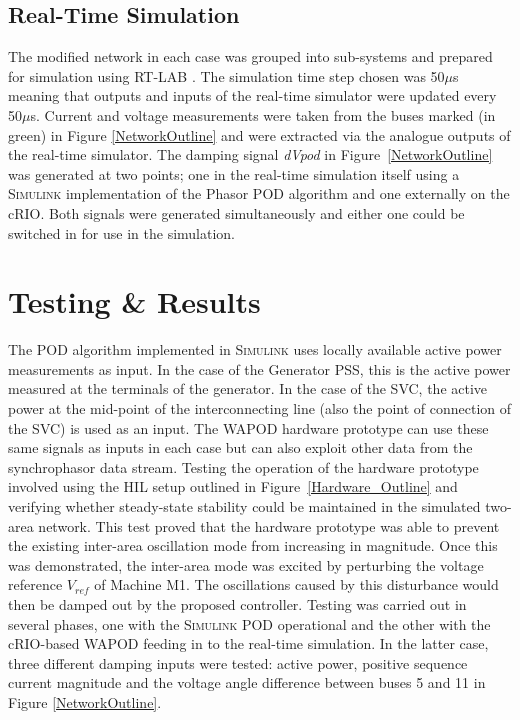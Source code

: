 \documentclass{ieeeaccess}
\begin{document}
\subsection{Real-Time Simulation}
The modified network in each case was grouped into sub-systems and prepared for simulation using RT-LAB \cite{eMEGASIM}. The simulation time step chosen was 50$\mu$s meaning that outputs and inputs of the real-time simulator were updated every 50$\mu$s. Current and voltage measurements were taken from the buses marked (in green) in Figure \ref{NetworkOutline} and were extracted via the analogue outputs of the real-time simulator. The damping signal \emph{dVpod} in Figure~\ref{NetworkOutline} was generated at two points; one in the real-time simulation itself using a \textsc{Simulink} implementation of the Phasor POD algorithm and one externally on the cRIO. Both signals were generated simultaneously and either one could be switched in for use in the simulation.

\section{Testing \& Results}\label{Results}
The POD algorithm implemented in \textsc{Simulink} uses locally available active power measurements as input. In the case of the Generator PSS, this is the active power measured at the terminals of the generator. In the case of the SVC, the active power at the mid-point of the interconnecting line (also the point of connection of the SVC) is used as an input. The WAPOD hardware prototype can use these same signals as inputs in each case but can also exploit other data from the synchrophasor data stream. Testing the operation of the hardware prototype involved using the HIL setup outlined in Figure~\ref{Hardware_Outline} and verifying whether steady-state stability could be maintained in the simulated two-area network. This test proved that the hardware prototype was able to prevent the existing inter-area oscillation mode from increasing in magnitude. Once this was demonstrated, the inter-area mode was excited by perturbing the voltage reference $V_{ref}$ of Machine M1. The oscillations caused by this disturbance would then be damped out by the proposed controller. Testing was carried out in several phases, one with the \textsc{Simulink} POD operational and the other with the cRIO-based WAPOD feeding in to the real-time simulation. In the latter case, three different damping inputs were tested: active power, positive sequence current magnitude and the voltage angle difference between buses 5 and 11 in Figure \ref{NetworkOutline}.
\end{document}
